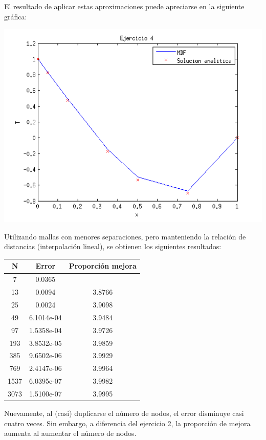 \documentclass{article}
\begin{document}
\begin{enumerate}[1)]
{        El resultado de aplicar estas aproximaciones puede apreciarse en la siguiente gráfica:

        \includegraphics[width=\textwidth]{ej4.png}

        Utilizando mallas con menores separaciones, pero manteniendo la relación de distancias
        (interpolación lineal), se obtienen los siguientes resultados:

        \begin{tabular}{|c|c|c|}
            \hline
            \textbf{N} & \textbf{Error} & \textbf{Proporción mejora} \\
            \hline
            7 & 0.0365 & \\
            \hline
            13 & 0.0094 & 3.8766 \\
            \hline
            25 & 0.0024 & 3.9098 \\
            \hline
            49 & 6.1014e-04 & 3.9484 \\
            \hline
            97 & 1.5358e-04 & 3.9726 \\
            \hline
            193 & 3.8532e-05 & 3.9859 \\
            \hline
            385 & 9.6502e-06 & 3.9929 \\
            \hline
            769 & 2.4147e-06 & 3.9964 \\
            \hline
            1537 & 6.0395e-07 & 3.9982 \\
            \hline
            3073 & 1.5100e-07 & 3.9995 \\
            \hline
        \end{tabular}

        Nuevamente, al (casi) duplicarse el número de nodos, el error disminuye casi cuatro
        veces. Sin embargo, a diferencia del ejercicio 2, la proporción de mejora aumenta
        al aumentar el número de nodos.
    }
\end{enumerate}
\end{document}
